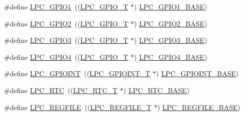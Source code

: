\begin{DoxyCompactItemize}
\item 
\#define \hyperlink{group__PERIPH__175X__6X__BASE_ga335587dad4e6d0da56c1f3ad1c087d10}{L\-P\-C\-\_\-\-G\-P\-I\-O1}~((\hyperlink{structLPC__GPIO__T}{L\-P\-C\-\_\-\-G\-P\-I\-O\-\_\-\-T}             $\ast$) \hyperlink{group__PERIPH__407X__8X__BASE_ga9fb0536853721a3073bd69d94d0b7ec2}{L\-P\-C\-\_\-\-G\-P\-I\-O1\-\_\-\-B\-A\-S\-E})
\item 
\#define \hyperlink{group__PERIPH__175X__6X__BASE_ga27a09e8c08f9e209c6af70b0a3c56b39}{L\-P\-C\-\_\-\-G\-P\-I\-O2}~((\hyperlink{structLPC__GPIO__T}{L\-P\-C\-\_\-\-G\-P\-I\-O\-\_\-\-T}             $\ast$) \hyperlink{group__PERIPH__407X__8X__BASE_gae5524b2d728167194033ec7a1841a36b}{L\-P\-C\-\_\-\-G\-P\-I\-O2\-\_\-\-B\-A\-S\-E})
\item 
\#define \hyperlink{group__PERIPH__175X__6X__BASE_ga6e961eb01d0f1e61dd9b9d5979d2aafc}{L\-P\-C\-\_\-\-G\-P\-I\-O3}~((\hyperlink{structLPC__GPIO__T}{L\-P\-C\-\_\-\-G\-P\-I\-O\-\_\-\-T}             $\ast$) \hyperlink{group__PERIPH__407X__8X__BASE_ga56c68c5326b521b3278a35f4d81369a9}{L\-P\-C\-\_\-\-G\-P\-I\-O3\-\_\-\-B\-A\-S\-E})
\item 
\#define \hyperlink{group__PERIPH__175X__6X__BASE_ga652a560a972d4edec8a67cd85ad4bd60}{L\-P\-C\-\_\-\-G\-P\-I\-O4}~((\hyperlink{structLPC__GPIO__T}{L\-P\-C\-\_\-\-G\-P\-I\-O\-\_\-\-T}             $\ast$) \hyperlink{group__PERIPH__407X__8X__BASE_gaa54352e7745932e78b56bcbc1d70fa21}{L\-P\-C\-\_\-\-G\-P\-I\-O4\-\_\-\-B\-A\-S\-E})
\item 
\#define \hyperlink{group__PERIPH__175X__6X__BASE_gaefe2f52407c1ce58395766dc760525b5}{L\-P\-C\-\_\-\-G\-P\-I\-O\-I\-N\-T}~((\hyperlink{structLPC__GPIOINT__T}{L\-P\-C\-\_\-\-G\-P\-I\-O\-I\-N\-T\-\_\-\-T}          $\ast$) \hyperlink{group__PERIPH__407X__8X__BASE_gadf88491f4b83b5af99eaf30778cb62fa}{L\-P\-C\-\_\-\-G\-P\-I\-O\-I\-N\-T\-\_\-\-B\-A\-S\-E})
\item 
\#define \hyperlink{group__PERIPH__175X__6X__BASE_ga8303d3e5135b2a039f0dc5f93c194f78}{L\-P\-C\-\_\-\-R\-T\-C}~((\hyperlink{structLPC__RTC__T}{L\-P\-C\-\_\-\-R\-T\-C\-\_\-\-T}              $\ast$) \hyperlink{group__PERIPH__407X__8X__BASE_ga4618213cf968f8245814d7d3e7aa2e2e}{L\-P\-C\-\_\-\-R\-T\-C\-\_\-\-B\-A\-S\-E})
\item 
\#define \hyperlink{group__PERIPH__175X__6X__BASE_ga2c74da31b7fd461d9b01e3241963f895}{L\-P\-C\-\_\-\-R\-E\-G\-F\-I\-L\-E}~((\hyperlink{structLPC__REGFILE__T}{L\-P\-C\-\_\-\-R\-E\-G\-F\-I\-L\-E\-\_\-\-T}          $\ast$) \hyperlink{group__PERIPH__407X__8X__BASE_gad2674eff10cea9243ab060ad1fbac9d2}{L\-P\-C\-\_\-\-R\-E\-G\-F\-I\-L\-E\-\_\-\-B\-A\-S\-E})

\end{DoxyCompactItemize}
